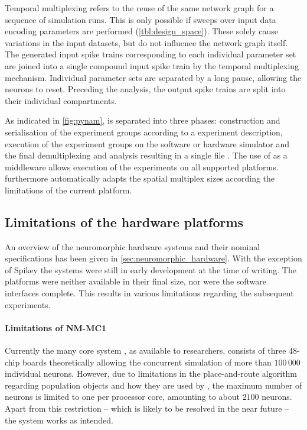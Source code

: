 Temporal multiplexing refers to the reuse of the same network graph for a sequence of simulation runs. This is only possible if sweeps over input data encoding parameters are performed (\cref{tbl:design_space}). These solely cause variations in the input datasets, but do not influence the network graph itself. The generated input spike trains corresponding to each individual parameter set are joined into a single compound input spike train by the temporal multiplexing mechanism. Individual parameter sets are separated by a long pause, allowing the neurons to reset. Preceding the analysis, the output spike trains are split into their individual compartments.

As indicated in \cref{fig:pynam}, \PyNAM is separated into three phases: construction and serialisation of the experiment groups according to a \JSON experiment description, execution of the experiment groups on the software or hardware simulator and the final demultiplexing and analysis resulting in a single \HDF file \cite{hdf2015website}. The use of \PyNNLess as a middleware allows execution of the experiments on all supported platforms. \PyNAM furthermore automatically adapts the spatial multiplex sizes according the limitations of the current platform.


\subsection{Limitations of the hardware platforms}
\label{sec:neuromorphic_hardware_status}

An overview of the neuromorphic hardware systems and their nominal specifications has been given in \cref{sec:neuromorphic_hardware}. With the exception of Spikey the systems were still in early development at the time of writing. The platforms were neither available in their final size, nor were the software interfaces complete. This results in various limitations regarding the subsequent experiments.

\paragraph{Limitations of NM-MC1}
Currently the many core system \mbox{\NMMC}, as available to \HBP researchers, consists of three 48-chip boards theoretically allowing the concurrent simulation of more than $100\,000$ individual neurons. However, due to limitations in the place-and-route algorithm regarding population objects and how they are used by \PyNAM, the maximum number of neurons is limited to one per processor core, amounting to about $2100$ \LIF neurons. Apart from this restriction -- which is likely to be resolved in the near future -- the system works as intended.

